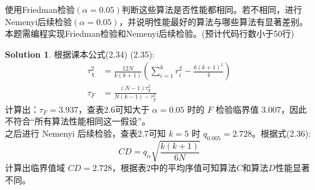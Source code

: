 \documentclass[a4paper,UTF8]{article}
\theoremstyle{definition}
\newtheorem*{solution}{Solution}
\begin{document}
使用Friedman检验$(\alpha=0.05)$判断这些算法是否性能都相同。若不相同，进行Nemenyi后续检验$(\alpha=0.05)$，并说明性能最好的算法与哪些算法有显著差别。本题需编程实现Friedman检验和Nemenyi后续检验。(预计代码行数小于50行)
\begin{solution}
根据课本公式(2.34) (2.35):
\begin{equation}\nonumber
\begin{aligned}
\tau_\chi^2 &= \frac{12N}{k(k+1)}\left(\sum_{i=1}^kr_i^2 - \frac{k(k+1)^2}{4}\right)\\ \tau_F &= \frac{(N-1)\tau_\chi^2}{N(k-1)-\tau_\chi^2}
\end{aligned}
\end{equation}
计算出：$\tau_F = 3.937$，查表2.6可知大于 $\alpha = 0.05$ 时的 $F$ 检验临界值 $3.007$，因此不符合“所有算法性能相同这一假设”。\\之后进行 Nemenyi 后续检验，查表2.7可知 $k=5$ 时 $q_{0.005}=2.728$。根据式(2.36):
\begin{equation}\nonumber
CD = q_\alpha \sqrt{\frac{k(k+1)}{6N}}
\end{equation}
计算出临界值域 $CD = 2.728$，根据表2中的平均序值可知算法$C$和算法$D$性能显著不同。 
\end{solution}
\end{document}
